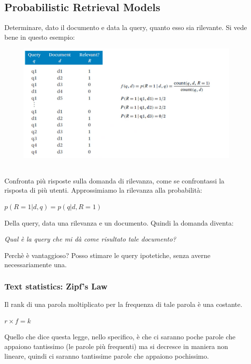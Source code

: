 \newpage    

\subsection{Probabilistic Retrieval Models}
Determinare, dato il documento e data la query, quanto esso sia rilevante. Si vede bene in questo esempio:
\\
\begin{figure}[th]
    \centering
    \includegraphics[scale=0.5]{Text Analysis/img/example.png}
\end{figure}
\\
Confronta più risposte sulla domanda di rilevanza, come se confrontassi la risposta di più utenti. Approssimiamo la rilevanza alla probabilità:
\begin{center}
    \begin{math}
        p(R=1|d,q) = p(q|d,R=1)
    \end{math}
\end{center}
Della query, data una rilevanza e un documento. Quindi la domanda diventa:
\begin{center}
    \textit{Qual è la query che mi dà come risultato tale documento?}
\end{center}
Perchè è vantaggioso? Posso stimare le query ipotetiche, senza averne necessariamente una. 

\subsubsection{Text statistics: Zipf's Law}
Il rank di una parola moltiplicato per la frequenza di tale parola è una costante.
\begin{center}
    \begin{math}
        r \times f = k
    \end{math}
\end{center}
Quello che dice questa legge, nello specifico, è che ci saranno poche parole che appaiono tantissimo (le parole più frequenti) ma si decresce in maniera non lineare, quindi ci saranno tantissime parole che appaiono pochissimo. 


